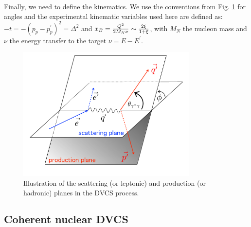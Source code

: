 \documentclass{article}
\begin{document}
Finally, we need to define the kinematics. We use the 
conventions from Fig. \ref{fig:PhiAngle} for angles and the experimental kinematic variables
used here are defined as: 
$-t = -(p_p-p_p^\prime)^2 = \Delta^2$ and 
$x_B = {Q^2 \over 2 M_N \nu}\sim {2\xi \over 1+\xi}$, with $M_N$ the nucleon mass and $\nu$ the
energy transfer to the target $\nu = {E -E^\prime} $. 

\begin{figure}[tbp!]
\center
\includegraphics[width=9cm]{fig1/finalplane.png}
	\caption{Illustration of the scattering (or leptonic) and production (or hadronic) planes
	in the DVCS process.} 
\label{fig:PhiAngle}
\end{figure}



\subsection{Coherent nuclear DVCS}
\end{document}
